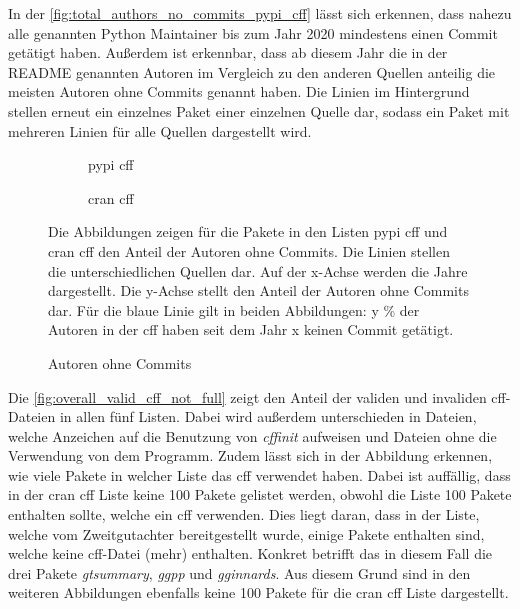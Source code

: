 In der \autoref{fig:total_authors_no_commits_pypi_cff} lässt sich erkennen, dass nahezu alle genannten Python Maintainer bis zum Jahr 2020 mindestens einen Commit getätigt haben.
Außerdem ist erkennbar, dass ab diesem Jahr die in der README genannten Autoren im Vergleich zu den anderen Quellen anteilig die meisten Autoren ohne Commits genannt haben.
Die Linien im Hintergrund stellen erneut ein einzelnes Paket einer einzelnen Quelle dar, sodass ein Paket mit mehreren Linien für alle Quellen dargestellt wird.

\begin{figure}
    \begin{subfigure}{.5\textwidth}
        \centering
        
        \caption{\gls{pypi} \gls{cff}}
        \label{fig:total_authors_no_commits_pypi_cff}
    \end{subfigure}%
    \begin{subfigure}{.5\textwidth}
        \centering
        
        \caption{\gls{cran} \gls{cff}}
        \label{fig:total_authors_no_commits_cran_cff}
    \end{subfigure}
    \caption{Autoren ohne Commits}
    \label{fig:total_authors_no_commits}
    \small
    Die Abbildungen zeigen für die Pakete in den Listen \gls{pypi} \gls{cff} und \gls{cran} \gls{cff} den Anteil der Autoren ohne Commits. Die Linien stellen die unterschiedlichen Quellen dar. Auf der x-Achse werden die Jahre dargestellt. Die y-Achse stellt den Anteil der Autoren ohne Commits dar. Für die blaue Linie gilt in beiden Abbildungen: y \% der Autoren in der \gls{cff} haben seit dem Jahr x keinen Commit getätigt.
\end{figure}

Die \autoref{fig:overall_valid_cff_not_full} zeigt den Anteil der validen und invaliden \gls{cff}-Dateien in allen fünf Listen.
Dabei wird außerdem unterschieden in Dateien, welche Anzeichen auf die Benutzung von \emph{cffinit} aufweisen und Dateien ohne die Verwendung von dem Programm.
Zudem lässt sich in der Abbildung erkennen, wie viele Pakete in welcher Liste das \gls{cff} verwendet haben.
Dabei ist auffällig, dass in der \gls{cran} \gls{cff} Liste keine 100 Pakete gelistet werden, obwohl die Liste 100 Pakete enthalten sollte, welche ein \gls{cff} verwenden.
Dies liegt daran, dass in der Liste, welche vom Zweitgutachter bereitgestellt wurde, einige Pakete enthalten sind, welche keine \gls{cff}-Datei (mehr) enthalten.
Konkret betrifft das in diesem Fall die drei Pakete \emph{gtsummary}, \emph{ggpp} und \emph{gginnards}.
Aus diesem Grund sind in den weiteren Abbildungen ebenfalls keine 100 Pakete für die \gls{cran} \gls{cff} Liste dargestellt.

